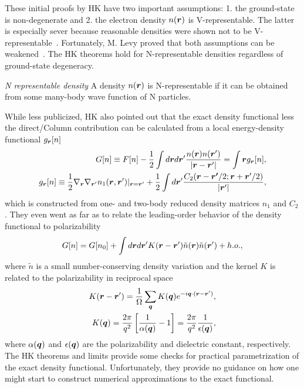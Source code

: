 These initial proofs by HK have two important assumptions: 1. the ground-state is non-degenerate and 2. the electron density $n(\boldsymbol{r})$ is V-representable. The latter is especially sever because reasonable densities were shown not to be V-representable~\cite{Levy1982,Lieb1983}. Fortunately, M. Levy proved that both assumptions can be weakened~\cite{Levy1979}. The HK theorems hold for N-representable densities regardless of ground-state degeneracy.
\begin{definition}
\textit{N representable density} A density $n(\boldsymbol{r})$ is N-representable if it can be obtained from some many-body wave function of N particles.
\end{definition}

While less publicized, HK also pointed out that the exact density functional less the direct/Column contribution can be calculated from a local energy-density functional $g_{\boldsymbol{r}}[n]$
\begin{align}
G[n]\equiv F[n]-\frac{1}{2}\int d\boldsymbol{r}d\boldsymbol{r}' \dfrac{n(\boldsymbol{r})n(\boldsymbol{r}')}{\vert\boldsymbol{r}-\boldsymbol{r}'\vert}=\int \boldsymbol{r} g_{\boldsymbol{r}}[n],\\
g_{\boldsymbol{r}}[n] \equiv \frac{1}{2}\nabla_{\boldsymbol{r}}\nabla_{\boldsymbol{r}'} n_1(\boldsymbol{r}, \boldsymbol{r}')\vert_{\boldsymbol{r}=\boldsymbol{r}'}+
\frac{1}{2}\int d\boldsymbol{r}' \dfrac{C_2(\boldsymbol{r}-\boldsymbol{r'}/2;\boldsymbol{r}+\boldsymbol{r}'/2)}{\vert\boldsymbol{r}'\vert},
\end{align}
which is constructed from one- and two-body reduced density matrices $n_1$ and $C_2$. They even went as far as to relate the leading-order behavior of the density functional to polarizability
\begin{align}
G[n] = G[n_0] + \int d\boldsymbol{r}d\boldsymbol{r}' K(\boldsymbol{r}-\boldsymbol{r}')\tilde{n}(\boldsymbol{r})\tilde{n}(\boldsymbol{r}')+h.o.,
\end{align}
where $\tilde{n}$ is a small number-conserving density variation and the kernel $K$ is related to the polarizability in reciprocal space
\begin{align}
K(\boldsymbol{r}-\boldsymbol{r}') = \dfrac{1}{\Omega}\sum\limits_{\boldsymbol{q}} K(\boldsymbol{q}) e^{-i\boldsymbol{q}\cdot(\boldsymbol{r}-\boldsymbol{r}')}, \\
K(\boldsymbol{q}) = \dfrac{2\pi}{q^2}\left[ \frac{1}{\alpha(\boldsymbol{q})}-1 \right] = \dfrac{2\pi}{q^2}\dfrac{1}{\epsilon(\boldsymbol{q})},
\end{align}
where $\alpha(\boldsymbol{q})$ and $\epsilon(\boldsymbol{q})$ are the polarizability and dielectric constant, respectively. The HK theorems and limits provide some checks for practical parametrization of the exact density functional. Unfortunately, they provide no guidance on how one might start to construct numerical approximations to the exact functional.


